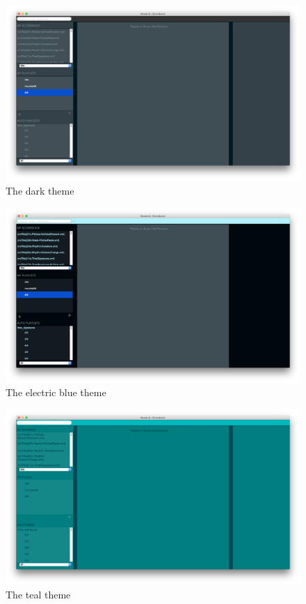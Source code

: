 \begin{figure}[H]
\centering
\includegraphics[width=400pt]{main_dark}
\caption{The dark theme}
\label{fig:theme2}	
\end{figure}

\begin{figure}[H]
\centering
\includegraphics[width=400pt]{main_electric}
\caption{The electric blue theme}
\label{fig:theme3}	
\end{figure}

\begin{figure}[H]
\centering
\includegraphics[width=400pt]{teal}
\caption{The teal theme}
\label{fig:theme4}	
\end{figure}

